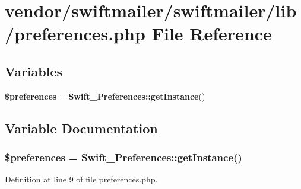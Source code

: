 \section{vendor/swiftmailer/swiftmailer/lib/preferences.php File Reference}
\label{_preferences_8php}
\subsection*{Variables}
\begin{DoxyCompactItemize}
\item 
{\bf \$preferences} = {\bf Swift\+\_\+\+Preferences\+::get\+Instance}()
\end{DoxyCompactItemize}


\subsection{Variable Documentation}
\subsubsection[{\$preferences}]{\setlength{\rightskip}{0pt plus 5cm}\$preferences = {\bf Swift\+\_\+\+Preferences\+::get\+Instance}()}\label{_preferences_8php_a715fba9cc6be2b297955b8848f9c7bf3}


Definition at line 9 of file preferences.\+php.

